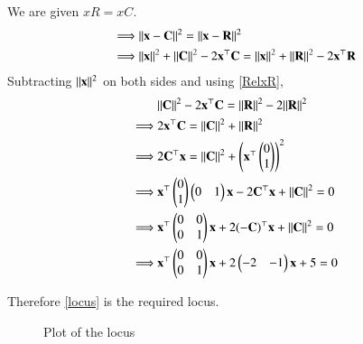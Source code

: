 \documentclass[journal,12pt,twocolumn]{IEEEtran}
\begin{document}
We are given $xR = xC$.  
\begin{align}
    \implies &\lVert\mathbf{x} - \mathbf{C}\rVert^2 = \lVert\mathbf{x} - \mathbf{R}\rVert^2\\ 
    \implies &\lVert\mathbf{x}\rVert^2+\lVert\mathbf{C}\rVert^2-2\mathbf{x}^\top \mathbf{C} = \lVert\mathbf{x}\rVert^2+\lVert\mathbf{R}\rVert^2-2\mathbf{x}^\top \mathbf{R}
\end{align}
Subtracting $\lVert\mathbf{x}\rVert^2$ on both sides and using \ref{RelxR},
\begin{align}
    &\lVert\mathbf{C}\rVert^2-2\mathbf{x}^\top \mathbf{C} = \lVert\mathbf{R}\rVert^2 - 2\lVert\mathbf{R}\rVert^2\\
    \implies &2\mathbf{x}^\top \mathbf{C} = \lVert\mathbf{C}\rVert^2+\lVert\mathbf{R}\rVert^2\\
    \implies &2\mathbf{C}^\top \mathbf{x} = \lVert\mathbf{C}\rVert^2+\begin{pmatrix}\mathbf{x}^\top \begin{pmatrix}0\\1\end{pmatrix}\end{pmatrix}^2\\
    \implies &\mathbf{x}^\top \begin{pmatrix}0\\1\end{pmatrix} \begin{pmatrix}0 & 1\end{pmatrix} \mathbf{x} - 2\mathbf{C}^\top \mathbf{x} + \lVert\mathbf{C}\rVert^2 = 0\\
    \implies &\mathbf{x}^\top \begin{pmatrix}0&0\\0&1\end{pmatrix}\mathbf{x} + 2(-\mathbf{C})^\top\mathbf{x} + \lVert\mathbf{C}\rVert^2 = 0\\
    \implies &\mathbf{x}^\top \begin{pmatrix}0&0\\0&1\end{pmatrix}\mathbf{x} + 2\begin{pmatrix}-2&-1\end{pmatrix}\mathbf{x} + 5 = 0\label{locus}
\end{align}

Therefore \ref{locus} is the required locus. 
\begin{figure}
    \centering
    \caption{Plot of the locus}
\end{figure}
\end{document}

